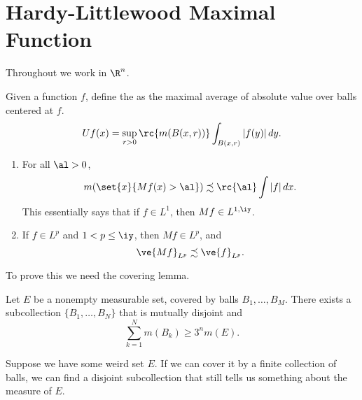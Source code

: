 \def\filepath{C:/Users/Owner/Dropbox/Math/templates}





%


%

\pagestyle{fancy}
\chead{} 
\rhead{} 
\lfoot{} 
\cfoot{\thepage} 
\rfoot{} 
\renewcommand{\headrulewidth}{.3pt} 
\setlength\voffset{0in}
\setlength\textheight{648pt}


\section{Hardy-Littlewood Maximal Function}
Throughout we work in $\R^n$.
\begin{df}
Given a function $f$, define the  as the maximal average of absolute value over balls centered at $f$.
\[
Uf(x)=\sup_{r>0} \rc{m(B(x,r))} \int_{B(x,r)} |f(y)|\,dy.
\]
\end{df}
\begin{thm}\label{thm:max-ineq}
\begin{enumerate}
\item
For all $\al>0$, 
\[
m(\set{x}{Mf(x)>\al})\precsim \rc{\al}\int |f|\,dx.
\]
This essentially says that if $f\in L^1$, then $Mf\in L^{1,\iy}$. 
\item If $f\in L^p$ and $1<p\le \iy$, then $Mf\in L^p$, and 
\[
\ve{Mf}_{L^p}\precsim \ve{f}_{L^p}.
\]
\end{enumerate}
\end{thm}
To prove this we need the covering lemma. 
\begin{lem}\label{lem:covering}
Let $E$ be a nonempty measurable set, covered by balls $B_1,\ldots, B_M$. There exists a subcollection $\{B_1,\ldots, B_N\}$ that is mutually disjoint and
\[
\sum_{k=1}^N m(B_k) \ge 3^n m(E).
\]
\end{lem}

Suppose we have some weird set $E$. If we can cover it by a finite collection of balls, we can find a disjoint subcollection that still tells us something about the measure of $E$.

